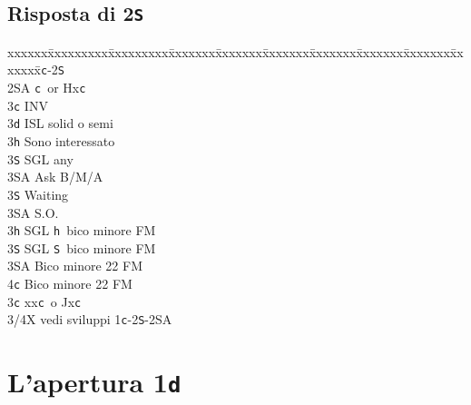 \documentclass[a4paper,italian]{article}
\newcommand{\BS}{\small{\texttt{S}}}
\newcommand{\BC}{\small{\texttt{c}}}
\newcommand{\BD}{\small{\texttt{d}}}
\newcommand{\BH}{\small{\texttt{h}}}
\newcommand{\pdfd}{\texorpdfstring{\texttt{d}}{D}}
\newcommand{\pdfs}{\texorpdfstring{\texttt{S}}{S}}
\newenvironment{bidtable}
{\begin{tabbing}

    xxxxxx\=xxxxxxxxx\=xxxxxxxxx\=xxxxxxx\=xxxxxxx\=xxxxxxx\=xxxxxxx\=xxxxxxx\=xxxxxxx\=xxxxxxx\=\kill}
{\end{tabbing} }%
\begin{document}
\begin{minipage}[t]{.493\textwidth}

    \subsection{Risposta di 2\pdfs}

    \begin{bidtable}
        1\BC-2\BS\+\\
        2\small{SA} \BC\ or Hx\BC \+\\
        3\BC \> INV\\
        3\BD \> ISL solid o semi\+\\
        3\BH \> Sono interessato\+\\
        3\BS \> SGL any\+\\
        3\small{SA} \> Ask B/M/A\-\-\\
        3\BS \> Waiting\\
        3\small{SA} \> S.O.\-\\
        3\BH \> SGL \BH\ bico minore FM\\
        3\BS \> SGL \BS\ bico minore FM\\
        3\small{SA} \> Bico minore 22 FM\\
        4\BC \> Bico minore 22 FM\-\\
        3\BC \> xx\BC\ o Jx\BC \+\\
        3/4X \> vedi sviluppi 1\BC -2\BS -2\small{SA}\-\-
    \end{bidtable}
\end{minipage}
{
    {\vrule width 1pt}
}
\newpage

\section{L'apertura 1\pdfd}
\end{document}
